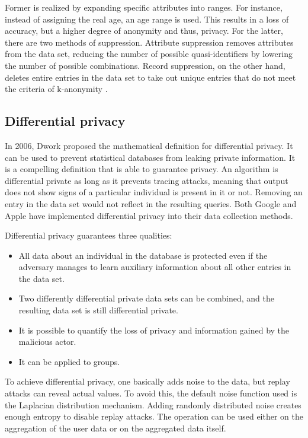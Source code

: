 Former is realized by expanding specific attributes into ranges. For instance, instead of assigning the real age, an age range is used. This results in a loss of accuracy, but a higher degree of anonymity and thus, privacy. For the latter, there are two methods of suppression. Attribute suppression removes attributes from the data set, reducing the number of possible quasi-identifiers by lowering the number of possible combinations. Record suppression, on the other hand, deletes entire entries in the data set to take out unique entries that do not meet the criteria of k-anonymity \cite{singapore}.

\subsection{Differential privacy}
In 2006, Dwork \cite{DBLP:conf/icalp/Dwork06} proposed the mathematical definition for differential privacy. It can be used to prevent statistical databases from leaking private information. It is a compelling definition that is able to guarantee privacy. An algorithm is differential private as long as it prevents tracing attacks, meaning that output does not show signs of a particular individual is present in it or not. Removing an entry in the data set would not reflect in the resulting queries.
Both Google \cite{erlingsson_2014} and Apple \cite{apple} have implemented differential privacy into their data collection methods.

Differential privacy guarantees three qualities:
\begin{itemize}
    \item All data about an individual in the database is protected even if the adversary manages to learn auxiliary information about all other entries in the data set.
    \item Two differently differential private data sets can be combined, and the resulting data set is still differential private.
    \item It is possible to quantify the loss of privacy and information gained by the malicious actor.
    \item It can be applied to groups.
\end{itemize}

To achieve differential privacy, one basically adds noise to the data, but replay attacks can reveal actual values. To avoid this, the default noise function used is the Laplacian distribution mechanism. Adding randomly distributed noise creates enough entropy to disable replay attacks. The operation can be used either on the aggregation of the user data or on the aggregated data itself.

